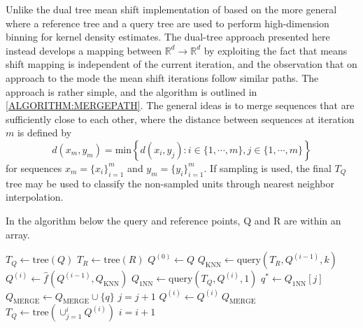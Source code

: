 \documentclass[10pt,oneside]{article}
\begin{document}
Unlike the dual tree mean shift implementation of \cite{wang2007fast} based on the more general \cite{gray2001} where a reference tree and a query tree are used to perform high-dimension binning for kernel density estimates.  
The dual-tree approach presented here instead develops a mapping between $\mathbb{R}^d \to \mathbb{R}^d$ by exploiting the fact that means shift mapping is independent of the current iteration, and the observation that on approach to the mode the mean shift iterations follow similar paths.  
The approach is rather simple, and the algorithm is outlined in \ref{ALGORITHM:MERGEPATH}.  
The general ideas is to merge sequences that are sufficiently close to each other, where the distance between sequences at iteration $m$ is defined by
\begin{equation}
  d( x_m, y_m) = \text{min} \left\{ d(x_i, y_j): i \in \{1,\cdots,m\}, j \in \{1, \cdots, m\}  \right\}
\end{equation}
for sequences $x_m = \{x_i\}_{i=1}^m$ and $y_m = \{y_i\}_{i=1}^m$.
If sampling is used, the final $T_Q$ tree may be used to classify the non-sampled units through nearest neighbor interpolation.


In the algorithm below the query and reference points, Q and R are within an array. 
\begin{algorithm}[H]
  \label{ALGORITHM:MERGEPATH}
\begin{algorithmic}
  \STATE $T_Q \gets \text{tree}(Q) $ 
  \STATE $T_R \gets \text{tree}(R) $ 
\STATE $Q^{(0)} \gets Q$
  \STATE $Q_{\text{KNN}} \gets \text{query}(T_R, Q^{(i-1)},k)$  
  \STATE $Q^{(i)} \gets \hat{f}(Q^{(i-1)},Q_{\text{KNN}})$ 
  \STATE $Q_{\text{1NN}} \gets \text{query}(T_Q, Q^{(i)},1)$ 
    \STATE $q^* \gets Q_{\text{1NN}}[j]$
      \STATE $Q_{\text{MERGE}} \gets Q_{\text{MERGE}} \cup \{q\}$
    \ENDIF
    \STATE $j = j + 1$
  \ENDWHILE
  \STATE $Q^{(i)} \gets Q^{(i)} \ Q_{\text{MERGE}}$
  \STATE $T_Q \gets \text{tree}\left( \cup_{j=1}^i Q^{(i)} \right)$ 
  \STATE $i = i +1$
\ENDWHILE
\end{algorithmic}
\end{algorithm}
\end{document}
